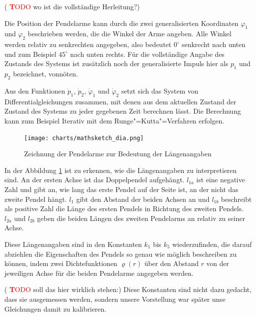 \documentclass[a4paper, 10pt]{article}
\newcommand{\TODO}{\textcolor{red}{ \textbf TODO }}
\renewcommand{\phi}{\varphi} %
\renewcommand{\rho}{\varrho}
\newcommand{\phid}{\dot{\phi}}  %
\begin{document}
(\TODO wo ist die vollständige Herleitung?)

Die Position der Pendelarme kann durch die zwei generalisierten Koordinaten $\phi_1$ und $\phi_2$ beschrieben werden, die die Winkel der Arme angeben.
Alle Winkel werden relativ zu senkrechten angegeben, also bedeutet $0^\circ$ senkrecht nach unten und zum Beispiel $45^\circ$ nach unten rechts.
Für die vollständige Angabe des Zustands des Systems ist zusätzlich noch der generalisierte Impuls hier als $p_1$ und $p_2$ bezeichnet, vonnöten.

Aus den Funktionen $\dot{p}_1$, $\dot{p}_2$, $\phid_1$ und $\phid_2$ setzt sich das System von Differentialgleichungen zusammen, mit denen aus dem aktuellen Zustand der Zustand des Systems zu jeder gegebenen Zeit berechnen lässt.
Die Berechnung kann zum Beispiel Iterativ mit dem Runge"=Kutta"=Verfahren erfolgen.

\begin{figure}[bht]
  \texttt{[image: charts/mathsketch\_dia.png]}
  \caption{Zeichnung der Pendelarme zur Bedeutung der Längenangaben}
  \label{fig:mathsketch}
\end{figure}

In der Abbildung \ref{fig:mathsketch} ist zu erkennen, wie die Längenangaben zu interpretieren sind.
An der ersten Achse ist das Doppelpendel aufgehängt.
$l_{1a}$ ist eine negative Zahl und gibt an, wie lang das erste Pendel auf der Seite ist, an der nicht das zweite Pendel hängt.
$l_1$ gibt den Abstand der beiden Achsen an und $l_{1b}$ beschreibt als positive Zahl die Länge des ersten Pendels in Richtung des zweiten Pendels.
$l_{2a}$ und $l_{2b}$ geben die beiden Längen des zweiten Pendelarms an relativ zu seiner Achse.

Diese Längenangaben sind in den Konstanten $k_1$ bis $k_5$ wiederzufinden, die darauf abziehlen die Eigenschaften des Pendels so genau wie möglich beschreiben zu können, indem zwei Dichtefunktionen $\rho(r)$ über den Abstand $r$ von der jeweiligen Achse für die beiden Pendelarme angegeben werden.

(\TODO soll das hier wirklich stehen:) Diese Konstanten sind nicht dazu gedacht, dass sie ausgemessen werden, sondern unsere Vorstellung war später unse Gleichungen damit zu kalibrieren.
\end{document}

